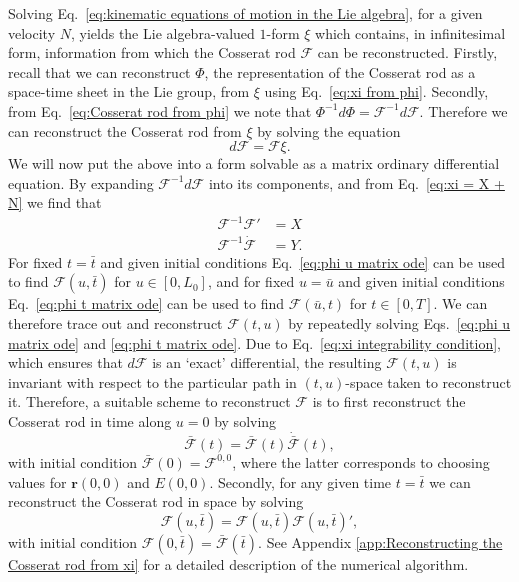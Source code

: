 Solving Eq.~\ref{eq:kinematic equations of motion in the Lie algebra}, for a given velocity $N$, yields the Lie algebra-valued $1$-form $\xi$ which contains, in infinitesimal form, information from which the Cosserat rod $\mathcal{F}$ can be reconstructed. Firstly, recall that we can reconstruct $\Phi$, the representation of the Cosserat rod as a space-time sheet in the Lie group, from $\xi$ using Eq.~\ref{eq:xi from phi}. Secondly, from Eq.~\ref{eq:Cosserat rod from phi} we note that $\Phi^{-1} d \Phi = \mathcal{F}^{-1} d \mathcal{F}$. Therefore we can reconstruct the Cosserat rod from $\xi$ by solving the equation
\begin{equation}
d \mathcal{F} = \mathcal{F} \xi.
\end{equation}
We will now put the above into a form solvable as a matrix ordinary differential equation. By expanding $\mathcal{F}^{-1} d \mathcal{F}$ into its components, and from Eq.~\ref{eq:xi = X + N} we find that
\begin{subequations} \label{eq:reconstruction of F eqs}
\begin{align}
\mathcal{F}^{-1} \mathcal{F}' & = X \label{eq:phi u matrix ode} \\
\mathcal{F}^{-1} \dot{\mathcal{F}} & = Y. \label{eq:phi t matrix ode}
\end{align}
\end{subequations}
For fixed $t = \bar{t}$ and given initial conditions Eq.~\ref{eq:phi u matrix ode} can be used to find $\mathcal{F}(u,\bar{t})$ for $u \in [0, L_0]$, and for fixed $u = \bar{u}$ and given initial conditions Eq.~\ref{eq:phi t matrix ode} can be used to find $\mathcal{F}(\bar{u}, t)$ for $t \in [0, T]$. We can therefore trace out and reconstruct $\mathcal{F}(t,u)$ by repeatedly solving Eqs.~\ref{eq:phi u matrix ode} and \ref{eq:phi t matrix ode}. Due to Eq.~\ref{eq:xi integrability condition}, which ensures that $d \mathcal{F}$ is an `exact' differential, the resulting $\mathcal{F}(t,u)$ is invariant with respect to the particular path in $(t,u)$-space taken to reconstruct it. Therefore, a suitable scheme to reconstruct $\mathcal{F}$ is to first reconstruct the Cosserat rod in time along $u=0$ by solving
\begin{equation} \label{eq:1st step reconstruction}
\bar{\mathcal{F}}(t) = \bar{\mathcal{F}}(t) \dot{\bar{\mathcal{F}}}(t),
\end{equation}
with initial condition $\bar{\mathcal{F}}(0) = \mathcal{F}^{0,0}$, where the latter corresponds to choosing values for $\mathbf{r}(0,0)$ and $E(0,0)$. Secondly, for any given time $t = \bar{t}$ we can reconstruct the Cosserat rod in space by solving
\begin{equation}
\mathcal{F}(u,\bar{t}) = \mathcal{F}(u, \bar{t}) \mathcal{F}(u, \bar{t})',
\end{equation}
with initial condition $\mathcal{F}(0, \bar{t}) = \bar{\mathcal{F}}(\bar{t})$. See Appendix \ref{app:Reconstructing the Cosserat rod from xi} for a detailed description of the numerical algorithm.

